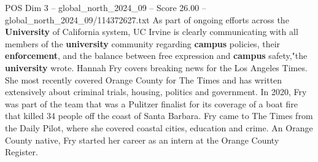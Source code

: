 \begin{textsample}{POS Dim 3 – global\_north\_2024\_09 – Score 26.00 – global\_north\_2024\_09/114372627.txt}
As part of ongoing efforts across the \textbf{University} of California system, UC Irvine is clearly communicating with all members of the \textbf{university} community regarding \textbf{campus} policies, their \textbf{enforcement}, and the balance between free expression and \textbf{campus} safety,"the \textbf{university} wrote.
Hannah Fry covers breaking news for the Los Angeles Times.
She most recently covered Orange County for The Times and has written extensively about criminal trials, housing, politics and government.
In 2020, Fry was part of the team that was a Pulitzer finalist for its coverage of a boat fire that killed 34 people off the coast of Santa Barbara.
Fry came to The Times from the Daily Pilot, where she covered coastal cities, education and crime.
An Orange County native, Fry started her career as an intern at the Orange County Register.

\end{textsample}
